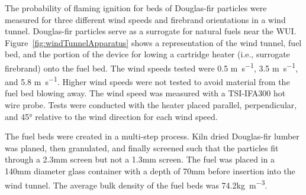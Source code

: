     The probability of flaming ignition for beds of Douglas-fir particles were measured for three different wind speeds and firebrand orientations in a wind tunnel. Douglas-fir particles serve as a surrogate for natural fuels near the WUI. Figure~\ref{fig:windTunnelApparatus} shows a representation of the wind tunnel, fuel bed, and the portion of the device for lowing a cartridge heater (i.e., surrogate firebrand) onto the fuel bed.  The wind speeds tested were 0.5 \si{\meter\per\second}, 3.5 \si{\meter\per\second}, and 5.8 \si{\meter\per\second}. Higher wind speeds were not tested to avoid material from the fuel bed blowing away. The wind speed was measured with a TSI-IFA300 hot wire probe. Tests were conducted with the heater placed parallel, perpendicular, and 45\si{\degree} relative to the wind direction for each wind speed. 

    
    The fuel beds were created in a multi-step process. Kiln dried Douglas-fir lumber was planed, then granulated, and finally screened such that the particles fit through a 2.3\si{\milli\meter} screen but not a 1.3\si{\milli\meter} screen. The fuel was placed in a 140\si{\milli\meter} diameter glass container with a depth of 70\si{\milli\meter} before insertion into the wind tunnel. The average bulk density of the fuel beds was 74.2\si{\kilo\gram\per\cubic\meter}.   
    
